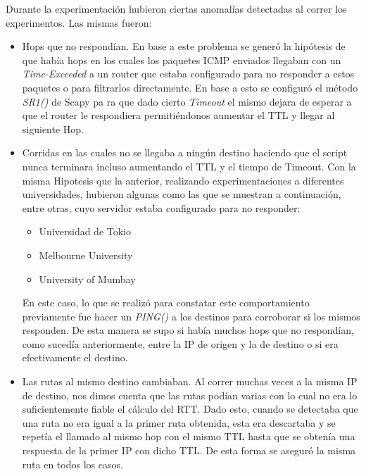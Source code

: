 Durante la experimentación hubieron ciertas anomalías detectadas al correr los experimentos. Las mismas fueron:

\begin{itemize}
    \item Hops que no respondían. En base a este problema se generó la hipótesis de que había hops en los cuales los paquetes ICMP enviados llegaban con un \textit{Time-Exceeded} a un router que estaba configurado para no responder a estos paquetes o para filtrarlos directamente. En base a esto se configuró el método \textit{SR1()} de Scapy pa ra que dado cierto \textit{Timeout} el mismo dejara de esperar a que el router le respondiera permitiéndonos aumentar el TTL y llegar al siguiente Hop.
    \item Corridas en las cuales no se llegaba a ningún destino haciendo que el script nunca terminara incluso aumentando el TTL y el tiempo de Timeout. Con la misma Hipotesis que la anterior, realizando experimentaciones a diferentes universidades, hubieron algunas como las que se muestran a continuación, entre otras, cuyo servidor estaba configurado para no responder:
    \begin{itemize}
        \item Universidad de Tokio
        \item Melbourne University
        \item University of Mumbay
    \end{itemize}
    En este caso, lo que se realizó para constatar este comportamiento previamente fue hacer un \textit{PING()} a los destinos para corroborar si los mismos responden. De esta manera se supo si había muchos hops que no respondían, como sucedía anteriormente, entre la IP de origen y la de destino o si era efectivamente el destino.
    \item Las rutas al mismo destino cambiaban. Al correr muchas veces a la misma IP de destino, nos dimos cuenta que las rutas podían varias con lo cual no era lo suficientemente fiable el cálculo del RTT. Dado esto, cuando se detectaba que una ruta no era igual a la primer ruta obtenida, esta era descartaba y se repetía el llamado al mismo hop con el mismo TTL hasta que se obtenía una respuesta de la primer IP con dicho TTL. De esta forma se aseguró la misma ruta en todos los casos.

\end{itemize}
